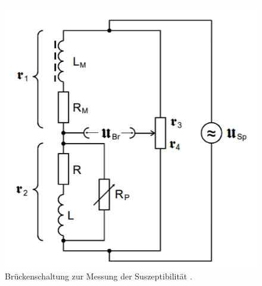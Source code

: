 \begin{figure}[H]
\centering
\includegraphics[scale=0.8]{schaltung.png}
\caption{Brückenschaltung zur Messung der Suszeptibilität \cite{kent}.}
\label{fig:schaltung}
\end{figure}
